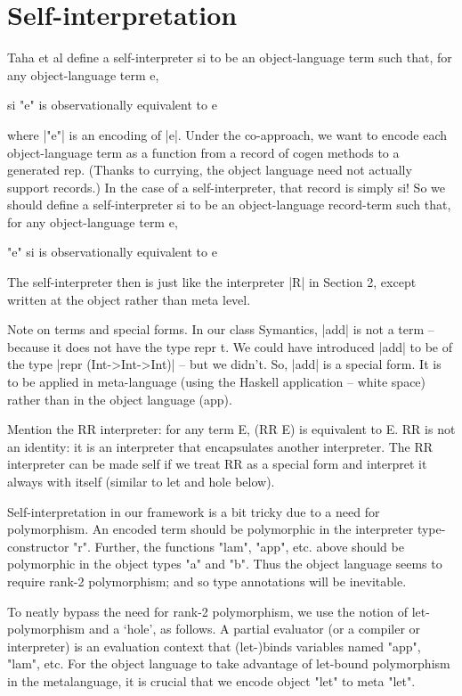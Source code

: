 \documentclass[preprint]{sigplanconf}
\begin{document}
\section{Self-interpretation}

Taha et al define a self-interpreter si to be an object-language term
such that, for any object-language term e,

\begin{code}
  si "e"    is observationally equivalent to    e
\end{code}

where |"e"| is an encoding of |e|.  Under the co-approach, we want to encode
each object-language term as a function from a record of cogen methods
to a generated rep.  (Thanks to currying, the object language need not
actually support records.)  In the case of a self-interpreter, that
record is simply si!  So we should define a self-interpreter si to be an
object-language record-term such that, for any object-language term e,

\begin{code}
  "e" si    is observationally equivalent to    e
\end{code}

The self-interpreter then is just like the interpreter
|R| in Section 2, except written at the object rather than meta level.

Note on terms and special forms. In our class Symantics, |add|
is not a term -- because it does not have the type repr t. We could
have introduced |add| to be of the type |repr (Int->Int->Int)| -- but we
didn't. So, |add| is a special form. It is to be applied in
meta-language (using the Haskell application -- white space) rather
than in the object language (app). 

Mention the RR interpreter: for any term E, (RR E) is equivalent to E.
RR is not an identity: it is an interpreter that encapsulates another
interpreter. The RR interpreter can be made self if we treat RR as a
special form and interpret it always with itself (similar to let and
hole below).


Self-interpretation in our framework is
a bit tricky due to a need for polymorphism.  An encoded term should
be polymorphic in the interpreter type-constructor "r".  Further, the
functions "lam", "app", etc. above should be polymorphic in the object
types "a" and "b".  Thus the object language seems to require rank-2
polymorphism; and so type annotations will be inevitable.


To neatly bypass the need for rank-2 polymorphism, we use the notion
of let-polymorphism and a `hole', as follows.  A partial evaluator (or
a compiler or interpreter) is an evaluation context that (let-)binds
variables named "app", "lam", etc.  For the object language to
take advantage of let-bound polymorphism in the metalanguage, it
is crucial that we encode object "let" to meta "let".  
\end{document}
